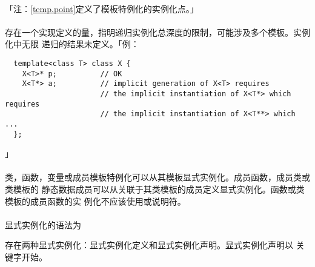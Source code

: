\paragraph{}
「注：\ref{temp.point}定义了模板特例化的实例化点。」

\paragraph{}
存在一个实现定义的量，指明递归实例化总深度的限制，可能涉及多个模板。实例化中无限
递归的结果未定义。「例：
\begin{lstlisting}
  template<class T> class X {
    X<T>* p;          // OK
    X<T*> a;          // implicit generation of X<T> requires
                      // the implicit instantiation of X<T*> which requires
                      // the implicit instantiation of X<T**> which ...
  };
\end{lstlisting}」

\paragraph{}
类，函数，变量或成员模板特例化可以从其模板显式实例化。成员函数，成员类或类模板的
静态数据成员可以从关联于其类模板的成员定义显式实例化。函数或类模板的成员函数的实
例化不应该使用或说明符。

\paragraph{}
显式实例化的语法为


存在两种显式实例化：显式实例化定义和显式实例化声明。显式实例化声明以
关键字开始。

